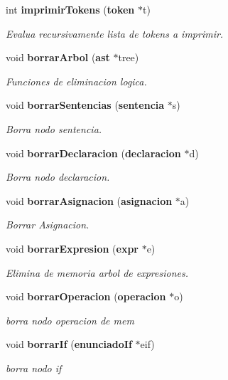 \begin{CompactItemize}
int {\bf imprimir\-Tokens} ({\bf token} $\ast$t)
\begin{CompactList}\small\item\em Evalua recursivamente lista de tokens a imprimir. \item\end{CompactList}\item 
void {\bf borrar\-Arbol} ({\bf ast} $\ast$tree)
\begin{CompactList}\small\item\em Funciones de eliminacion logica. \item\end{CompactList}\item 
void {\bf borrar\-Sentencias} ({\bf sentencia} $\ast$s)
\begin{CompactList}\small\item\em Borra nodo sentencia. \item\end{CompactList}\item 
void {\bf borrar\-Declaracion} ({\bf declaracion} $\ast$d)
\begin{CompactList}\small\item\em Borra nodo declaracion. \item\end{CompactList}\item 
void {\bf borrar\-Asignacion} ({\bf asignacion} $\ast$a)
\begin{CompactList}\small\item\em Borrar Asignacion. \item\end{CompactList}\item 
void {\bf borrar\-Expresion} ({\bf expr} $\ast$e)
\begin{CompactList}\small\item\em Elimina de memoria arbol de expresiones. \item\end{CompactList}\item 
void {\bf borrar\-Operacion} ({\bf operacion} $\ast$o)
\begin{CompactList}\small\item\em borra nodo operacion de mem \item\end{CompactList}\item 
void {\bf borrar\-If} ({\bf enunciado\-If} $\ast$eif)
\begin{CompactList}\small\item\em borra nodo if \item\end{CompactList}\item 

\end{CompactItemize}
